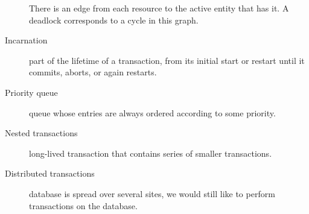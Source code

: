 \begin{description}
    There is an edge from each resource to the active entity that has it.
    A deadlock corresponds to a cycle in this graph.
  \item[Incarnation] part of the lifetime of a transaction, from its initial start or restart until it commits, aborts, or again restarts.
  \item[Priority queue] queue whose entries are always ordered according to some priority.
  \item[Nested transactions] long-lived transaction that contains series of smaller transactions.
  \item[Distributed transactions] database is spread over several sites, we would still like to perform transactions on the database.
\end{description}

\biblio


